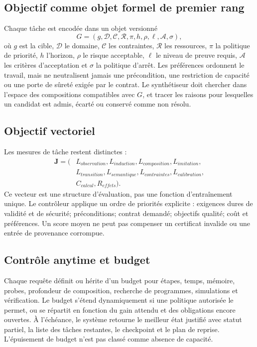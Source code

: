 \documentclass[11pt,a4paper]{article}
\begin{document}
\subsection{Objectif comme objet formel de premier rang}
Chaque tâche est encodée dans un objet versionné
\[
G=(g,\mathcal{D},\mathcal{C},\mathcal{R},\pi,h,\rho,\ell,\mathcal{A},\sigma),
\]
où \(g\) est la cible, \(\mathcal{D}\) le domaine, \(\mathcal{C}\) les contraintes, \(\mathcal{R}\) les ressources, \(\pi\) la politique de priorité, \(h\) l'horizon, \(\rho\) le risque acceptable, \(\ell\) le niveau de preuve requis, \(\mathcal{A}\) les critères d'acceptation et \(\sigma\) la politique d'arrêt. Les préférences ordonnent le travail, mais ne neutralisent jamais une précondition, une restriction de capacité ou une porte de sûreté exigée par le contrat. Le synthétiseur doit chercher dans l'espace des compositions compatibles avec \(G\), et tracer les raisons pour lesquelles un candidat est admis, écarté ou conservé comme non résolu.

\subsection{Objectif vectoriel}
Les mesures de tâche restent distinctes :
\[
\begin{aligned}
\mathbf{J}=(&L_{observation},L_{induction},L_{composition},L_{imitation},\\
           &L_{transition},L_{semantique},L_{contraintes},L_{calibration},\\
           &C_{calcul},R_{effets}).
\end{aligned}
\]
Ce vecteur est une structure d'évaluation, pas une fonction d'entraînement unique. Le contrôleur applique un ordre de priorités explicite : exigences dures de validité et de sécurité; préconditions; contrat demandé; objectifs qualité; coût et préférences. Un score moyen ne peut pas compenser un certificat invalide ou une entrée de provenance corrompue.

\subsection{Contrôle anytime et budget}
Chaque requête définit ou hérite d'un budget pour étapes, temps, mémoire, probes, profondeur de composition, recherche de programmes, simulations et vérification. Le budget s'étend dynamiquement si une politique autorisée le permet, ou se répartit en fonction du gain attendu et des obligations encore ouvertes. À l'échéance, le système retourne le meilleur état justifié avec statut partiel, la liste des tâches restantes, le checkpoint et le plan de reprise. L'épuisement de budget n'est pas classé comme absence de capacité.
\end{document}
